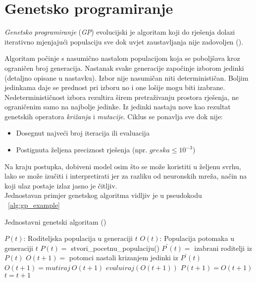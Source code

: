 \section{Genetsko programiranje}
\emph{Genetsko programiranje} (\emph{GP}) evolucijski je algoritam koji do rješenja dolazi iterativno mjenjajući populaciju sve dok uvjet zaustavljanja nije zadovoljen (\cite{conv_gen_programming}).

Algoritam počinje s nasumično nastalom populacijom koja se poboljšava kroz ograničen broj generacija.
Nastanak svake generacije započinje izborom jedinki (detaljno opisane u nastavku).
Izbor nije nasumičan niti determinističan.
Boljim jedinkama daje se prednost pri izboru no i one lošije mogu biti izabrane.
Nedeterminističnost izbora rezultira širem pretraživanju prostora rješenja, ne ograničenim samo na najbolje jedinke.
Iz jedinki nastaju nove kao rezultat genetskih operatora \emph{križanja} i \emph{mutacije}.
Ciklus se ponavlja sve dok nije:
\begin{itemize}
	\item{Dosegnut najveći broj iteracija ili evaluacija}
	\item{Postignuta željena preciznost rješenja (npr. $greska \leq 10^{-3}$})
\end{itemize}
Na kraju postupka, dobiveni model osim što se može koristiti u željenu svrhu, lako se može izučiti i interpretirati jer za razliku od neuronskih mreža, način na koji ulaz postaje izlaz jasno je čitljiv. \\
Jednostavan primjer genetskog algoritma vidljiv je u pseudokodu ~\ref{alg:gp_example}

\begin{algorithm}
	\caption{Jednostavni genetski algoritam (\cite{wong2015evolutionary})}
	\label{alg:gp_example}
	\begin{algorithmic}
		\STATE $P(t)$: Roditeljska populacija u generaciji $t$
		\STATE $O(t)$: Populacija potomaka u generaciji $t$
		\STATE $P(t)=$ stvori\_pocetnu\_populaciju()
			\STATE $P^{'}(t) =$ izabrani roditelji iz $P(t)$
			\STATE $O(t + 1) =$ potomci nastali krizanjem jedinki iz $P^{'}(t)$
			\STATE $O(t + 1) = mutiraj\ O(t + 1)$
			\STATE $evaluiraj(O(t + 1))$
			\STATE $P(t + 1) = O(t + 1)$
			\STATE $t = t + 1$
		\ENDWHILE
	\end{algorithmic}
\end{algorithm}

